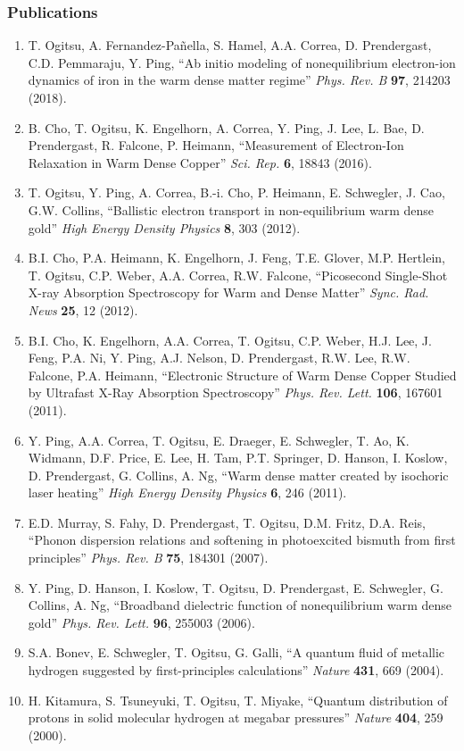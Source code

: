 \subsubsection*{Publications}
\begin{enumerate}
    \item T. Ogitsu, A. Fernandez-Pañella, S. Hamel, A.A. Correa, D. Prendergast, C.D. Pemmaraju, Y. Ping, “Ab initio modeling of nonequilibrium electron-ion dynamics of iron in the warm dense matter regime” {\it Phys. Rev. B} {\bf 97}, 214203 (2018).
    \item B. Cho, T. Ogitsu, K. Engelhorn, A. Correa, Y. Ping, J. Lee, L. Bae, D. Prendergast, R. Falcone, P. Heimann, “Measurement of Electron-Ion Relaxation in Warm Dense Copper” {\it Sci. Rep.} {\bf 6}, 18843 (2016).
    \item T. Ogitsu, Y. Ping, A. Correa, B.-i. Cho, P. Heimann, E. Schwegler, J. Cao, G.W. Collins, “Ballistic electron transport in non-equilibrium warm dense gold” {\it High Energy Density Physics} {\bf 8}, 303 (2012).
    \item B.I. Cho, P.A. Heimann, K. Engelhorn, J. Feng, T.E. Glover, M.P. Hertlein, T. Ogitsu, C.P. Weber, A.A. Correa, R.W. Falcone, “Picosecond Single-Shot X-ray Absorption Spectroscopy for Warm and Dense Matter” {\it Sync. Rad. News} {\bf 25}, 12 (2012).
    \item B.I. Cho, K. Engelhorn, A.A. Correa, T. Ogitsu, C.P. Weber, H.J. Lee, J. Feng, P.A. Ni, Y. Ping, A.J. Nelson, D. Prendergast, R.W. Lee, R.W. Falcone, P.A. Heimann, “Electronic Structure of Warm Dense Copper Studied by Ultrafast X-Ray Absorption Spectroscopy” {\it Phys. Rev. Lett.} {\bf 106}, 167601 (2011).
    \item Y. Ping, A.A. Correa, T. Ogitsu, E. Draeger, E. Schwegler, T. Ao, K. Widmann, D.F. Price, E. Lee, H. Tam, P.T. Springer, D. Hanson, I. Koslow, D. Prendergast, G. Collins, A. Ng, “Warm dense matter created by isochoric laser heating” {\it High Energy Density Physics} {\bf 6}, 246 (2011).
    \item E.D. Murray, S. Fahy, D. Prendergast, T. Ogitsu, D.M. Fritz, D.A. Reis, “Phonon dispersion relations and softening in photoexcited bismuth from first principles” {\it Phys. Rev. B} {\bf 75}, 184301 (2007).
    \item Y. Ping, D. Hanson, I. Koslow, T. Ogitsu, D. Prendergast, E. Schwegler, G. Collins, A. Ng, “Broadband dielectric function of nonequilibrium warm dense gold” {\it Phys. Rev. Lett.} {\bf 96}, 255003 (2006).
    \item S.A. Bonev, E. Schwegler, T. Ogitsu, G. Galli, “A quantum fluid of metallic hydrogen suggested by first-principles calculations” {\it Nature} {\bf 431}, 669 (2004).
    \item H. Kitamura, S. Tsuneyuki, T. Ogitsu, T. Miyake, “Quantum distribution of protons in solid molecular hydrogen at megabar pressures” {\it Nature} {\bf 404}, 259 (2000).
\end{enumerate}

